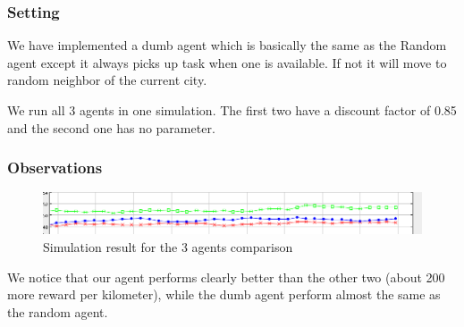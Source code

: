 \documentclass[11pt]{article}
\begin{document}
\subsubsection{Setting}
We have implemented a dumb agent which is basically the same as the
Random agent except it always picks up task when one is available. If
not it will move to random neighbor of the current city.

We run all 3 agents in one simulation. The first two have a discount
factor of 0.85 and the second one has no parameter.

\subsubsection{Observations}
\begin{figure}
  \caption{Simulation result for the 3 agents comparison}
  \includegraphics[scale=0.6]{compare_3}
\end{figure}

We notice that our agent performs clearly better than the other two
(about 200 more reward per kilometer), while the dumb agent perform
almost the same as the random agent.
\end{document}

